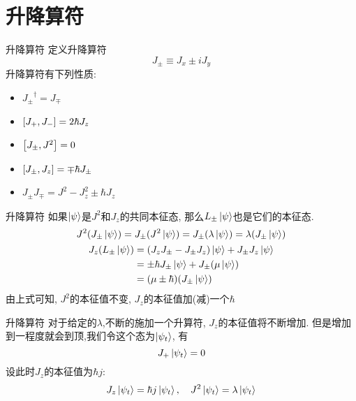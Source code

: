 \documentclass{beamer}
\begin{document}
\section{升降算符}

\begin{frame}{升降算符}
定义升降算符
\begin{equation}
J_{\pm} \equiv J_x \pm i J_y
\end{equation}
升降算符有下列性质:
\begin{itemize}
\item ${J_\pm}^\dag = J_\mp$
\item $\comm{J_+}{J_-} = 2 \hbar J_z$
\item $\comm{J_\pm}{J^2} = 0$
\item $\comm{J_\pm}{J_z} = \mp \hbar J_\pm$
\item $J_\pm J_\mp = J^2 - J_z^2 \pm \hbar J_z$
\end{itemize}
\end{frame}

\begin{frame}{升降算符}
如果$\ket{\psi}$是$J^2$和$J_z$的共同本征态, 那么$L_\pm \ket{\psi}$也是它们的本征态.
\begin{gather}
J^2(J_\pm \ket{\psi}) = J_\pm (J^2 \ket{\psi}) = J_\pm  (\lambda \ket{\psi}) = \lambda (J_\pm \ket{\psi}) \\
\begin{split}
J_z (L_\pm \ket{\psi}) &= (J_z J_\pm - J_\pm J_z) \ket{\psi} + J_\pm J_z \ket{\psi} \\
  &= \pm \hbar J_\pm \ket{\psi} + J_\pm (\mu \ket{\psi}) \\
  &= (\mu \pm \hbar) (J_\pm \ket{\psi})
\end{split}
\end{gather}
由上式可知, $J^2$的本征值不变, $J_z$的本征值加(减)一个$\hbar$
\end{frame}

\begin{frame}{升降算符}
对于给定的$\lambda$,不断的施加一个升算符, $J_z$的本征值将不断增加. 但是增加到一程度就会到顶,我们令这个态为$\ket{\psi_t}$, 有
\begin{equation}
J_+ \ket{\psi_t} = 0
\end{equation}
设此时$J_z$的本征值为$\hbar j$:
\begin{equation}
J_z \ket{\psi_t} = \hbar j \ket{\psi_t}, \quad J^2 \ket{\psi_t} = \lambda \ket{\psi_t}
\end{equation}

\end{frame}
\end{document}
